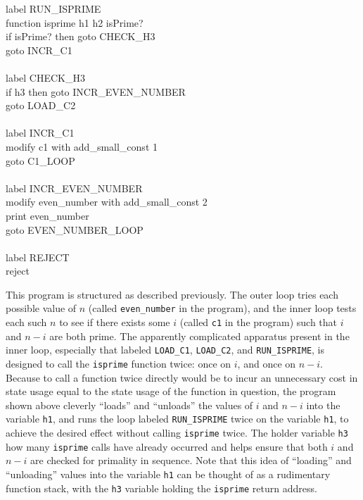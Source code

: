 \documentclass[11pt]{report}
\begin{document}
{\indent \indent	label RUN\_ISPRIME \\
\indent \indent	function isprime h1 h2 isPrime? \\
\indent \indent	if isPrime? then goto CHECK\_H3 \\
\indent \indent	goto INCR\_C1 \\ \\
\indent \indent	label CHECK\_H3 \\
\indent \indent	if h3 then goto INCR\_EVEN\_NUMBER \\
\indent \indent	goto LOAD\_C2 \\ \\
\indent \indent	label INCR\_C1 \\
\indent \indent	modify c1 with add\_small\_const 1 \\
\indent \indent	goto C1\_LOOP \\ \\
\indent	label INCR\_EVEN\_NUMBER \\
\indent	modify even\_number with add\_small\_const 2 \\
\indent	print even\_number \\
\indent	goto EVEN\_NUMBER\_LOOP \\ \\
label REJECT \\
reject \\ 
}		

This program is structured as described previously. The outer loop tries each possible value of $n$ (called \texttt{even\_number} in the program), and the inner loop tests each such $n$ to see if there exists some $i$ (called \texttt{c1} in the program) such that $i$ and $n-i$ are both prime. The apparently complicated apparatus present in the inner loop, especially that labeled \texttt{LOAD\_C1}, \texttt{LOAD\_C2}, and \texttt{RUN\_ISPRIME}, is designed to call the \texttt{isprime} function twice: once on $i$, and once on $n-i$. Because to call a function twice directly would be to incur an unnecessary cost in state usage equal to the state usage of the function in question, the program shown above cleverly ``loads'' and ``unloads'' the values of $i$ and $n-i$ into the variable \texttt{h1}, and runs the loop labeled \texttt{RUN\_ISPRIME} twice on the variable \texttt{h1}, to achieve the desired effect without calling \texttt{isprime} twice. The holder variable \texttt{h3} how many \texttt{isprime} calls have already occurred and helps ensure that both $i$ and $n-i$ are checked for primality in sequence. Note that this idea of ``loading'' and ``unloading'' values into the variable \texttt{h1} can be thought of as a rudimentary function stack, with the \texttt{h3} variable holding the \texttt{isprime} return address. 
\end{document}
